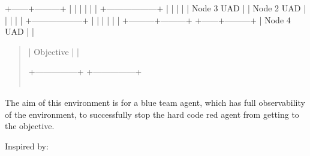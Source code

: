 \documentclass[letterpaper,10pt,english]{sphinxmanual}
\begin{document}
\sphinxAtStartPar
+——\textendash{}+———\sphinxhyphen{}+   |                   |     |                   |
|                   |   +——————\sphinxhyphen{}+     |                   |
|                   |                             |    Node 3 \sphinxhyphen{} UAD   |
|  Node 2 \sphinxhyphen{} UAD     |                             |                   |
|                   |   +——————\sphinxhyphen{}+     |                   |
|                   |   |                   |     +———+———+
+——\sphinxhyphen{}+———\textendash{}+   |   Node 4 \sphinxhyphen{} UAD    |               |
\begin{quote}

\begin{DUlineblock}{0em}
\item[] |    Objective      |               |
\end{DUlineblock}
\begin{description}
\item[{+—————+                   +—————+}] \leavevmode
\begin{DUlineblock}{0em}
\item[] {\color{red}\bfseries{}|}
\item[] {\color{red}\bfseries{}|}
\end{DUlineblock}


\begin{savenotes}\sphinxattablestart
\centering
\begin{tabulary}{\linewidth}[t]{|}
\hline

\end{tabulary}
\par
\sphinxattableend\end{savenotes}

\end{description}
\end{quote}

\sphinxAtStartPar
The aim of this environment is for a blue team agent, which has full observability of the
environment, to successfully stop the hard code red agent from getting to the objective.

\sphinxAtStartPar
Inspired by:
\sphinxhyphen{} 
\sphinxhyphen{} 
\end{document}
